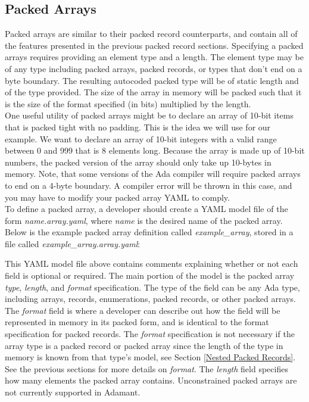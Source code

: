 \subsection{Packed Arrays} \label{Packed Arrays}

Packed arrays are similar to their packed record counterparts, and contain all of the features presented in the previous packed record sections. Specifying a packed arrays requires providing an element type and a length. The element type may be of any type including packed arrays, packed records, or types that don't end on a byte boundary. The resulting autocoded packed type will be of static length and of the type provided. The size of the array in memory will be packed such that it is the size of the format specified (in bits) multiplied by the length. \\

One useful utility of packed arrays might be to declare an array of 10-bit items that is packed tight with no padding. This is the idea we will use for our example. We want to declare an array of 10-bit integers with a valid range between 0 and 999 that is 8 elements long. Because the array is made up of 10-bit numbers, the packed version of the array should only take up 10-bytes in memory. Note, that some versions of the Ada compiler will require packed arrays to end on a 4-byte boundary. A compiler error will be thrown in this case, and you may have to modify your packed array YAML to comply. \\

To define a packed array, a developer should create a YAML model file of the form \textit{name.array.yaml}, where \textit{name} is the desired name of the packed array. Below is the example packed array definition called \textit{example\_array}, stored in a file called \textit{example\_array.array.yaml}:


This YAML model file above contains comments explaining whether or not each field is optional or required. The main portion of the model is the packed array \textit{type}, \textit{length}, and \textit{format} specification. The type of the field can be any Ada type, including arrays, records, enumerations, packed records, or other packed arrays. The \textit{format} field is where a developer can describe out how the field will be represented in memory in its packed form, and is identical to the format specification for packed records. The \textit{format} specification is not necessary if the array type is a packed record or packed array since the length of the type in memory is known from that type's model, see Section \ref{Nested Packed Records}. See the previous sections for more details on \textit{format}. The \textit{length} field specifies how many elements the packed array contains. Unconstrained packed arrays are not currently supported in Adamant.

